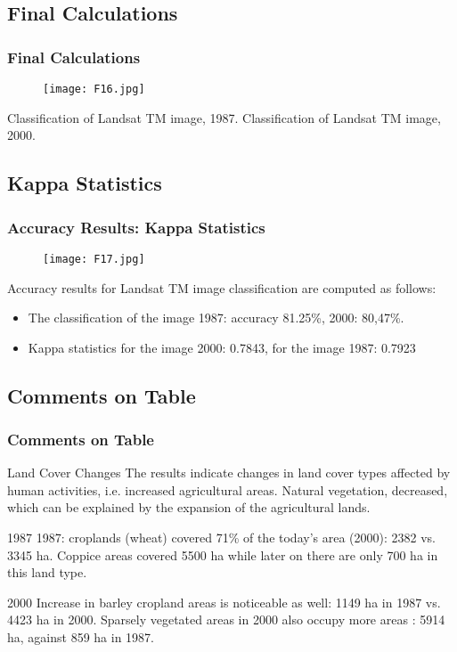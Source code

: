 \documentclass[pdflatex,compress,8pt,
	xcolor={dvipsnames,dvipsnames,svgnames,x11names,table},
	hyperref={colorlinks = true,
	breaklinks = true, 
	urlcolor = NavyBlue, 
	breaklinks = true}]{beamer}
\begin{document}
\subsection{Final Calculations}
\begin{frame}\frametitle{Final Calculations}
\begin{figure}[H]
	\centering
		\texttt{[image: F16.jpg]}
\end{figure}
Classification of Landsat TM image, 1987. 
Classification of Landsat TM image, 2000.
\end{frame}

\subsection{Kappa Statistics}
\begin{frame}\frametitle{Accuracy Results: Kappa Statistics}
\begin{figure}[H]
	\centering
		\texttt{[image: F17.jpg]}
\end{figure}
Accuracy results for Landsat TM image classification are computed as follows:
\begin{itemize}
	\item The classification of the image 1987: accuracy 81.25\%, 2000: 80,47\%.
	\item Kappa statistics for the  image 2000: 0.7843, for the image 1987: 0.7923
\end{itemize}
\end{frame}

\subsection{Comments on Table}
\begin{frame}\frametitle{Comments on Table}

\begin{alertblock}{Land Cover Changes}
The results indicate changes in land cover types affected by human activities, i.e. increased agricultural areas. Natural vegetation, decreased, which can be explained by the expansion of the agricultural lands.
\end{alertblock}

\begin{block}{1987}
1987: croplands (wheat) covered 71\% of the today's area (2000): 2382 vs. 3345 ha. Coppice areas covered 5500 ha while later on there are only 700 ha in this land type.
\end{block}

\begin{block}{2000}
Increase in barley cropland areas is noticeable as well: 1149 ha in 1987 vs. 4423 ha in 2000. Sparsely vegetated areas in 2000 also occupy more areas : 5914 ha, against 859 ha in 1987.
\end{block}
\end{frame}
\end{document}
